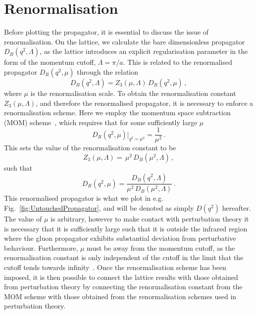 \section{Renormalisation}\label{sec:Renormalisation}
Before plotting the propagator, it is essential to discuss the issue of renormalisation. On the lattice, we calculate the bare dimensionless propagator $D_B(q^2,\Lambda)$, as the lattice introduces an explicit regularisation parameter in the form of the momentum cutoff, $\Lambda = \pi/a$. This is related to the renormalised propagator $D_R(q^2,\mu)$ through the relation
%
\begin{equation}
D_B(q^2,\Lambda) = Z_3(\mu, \Lambda)\, D_R(q^2,\mu)\, ,
\label{eq:LatticeRenormalisation}
\end{equation}
%
where $\mu$ is the renormalisation scale. To obtain the renormalisation constant $Z_3(\mu, \Lambda)$, and therefore the renormalised propagator, it is necessary to enforce a renormalisation scheme. Here we employ the momentum space subtraction (MOM) scheme~\cite{Bowman:2004jm,Leinweber:1998uu,Bonnet:2001uh}, which requires that for some sufficiently large $\mu$
%
\begin{equation}
D_R(q^2,\mu)\big|_{q^2=\mu^2}=\frac{1}{\mu^2}\, .
\end{equation}
%
This sets the value of the renormalisation constant to be
%
\begin{equation}
Z_3(\mu,\Lambda) = \, \mu^2 \, D_B(\mu^2,\Lambda)\, ,
\end{equation}
such that
%
\begin{equation}
D_R(q^2,\mu) = \frac{D_B(q^2,\Lambda)}{\mu^2 \, D_B(\mu^2,\Lambda)}\, .
\end{equation}
%
This renormalised propagator is what we plot in e.g. Fig.~\ref{fig:UntouchedPropagator}, and will be denoted as simply $D(q^2)$ hereafter. The value of $\mu$ is arbitrary, however to make contact with perturbation theory it is necessary that it is sufficiently large such that it is outside the infrared region where the gluon propagator exhibits substantial deviation from perturbative behaviour. Furthermore, $\mu$ must be away from the momentum cutoff, as the renormalisation constant is only independent of the cutoff in the limit that the cutoff tends towards infinity~\cite{Bonnet:2001uh,Boucaud:2006pc}.  Once the renormalisation scheme has been imposed, it is then possible to connect the lattice results with those obtained from perturbation theory by connecting the renormalisation constant from the MOM scheme with those obtained from the renormalisation schemes used in perturbation theory.\\
 
